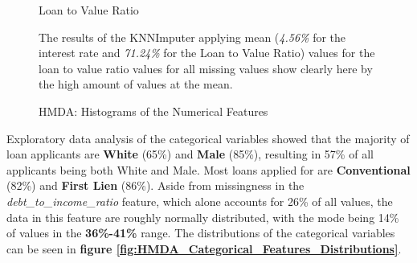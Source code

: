 \begin{figure}[h]
\begin{minipage}{0.5\textwidth}
        \small
        Loan to Value Ratio
    \end{minipage}    
    \caption{HMDA: Histograms of the Numerical Features}
    \medskip
    \small
    The results of the KNNImputer applying mean (\textit{4.56\%} for the interest rate and \textit{71.24\%} for the Loan to Value Ratio) values for the loan to value ratio values for all missing values show clearly here by the high amount of values at the mean.
    \label{fig:CHXX_Numerical_Distributions_2}
\end{figure}

Exploratory data analysis of the categorical variables showed that the majority of loan applicants are \textbf{White} (65\%) and \textbf{Male} (85\%), resulting in 57\% of all applicants being both White and Male.
Most loans applied for are \textbf{Conventional} (82\%) and \textbf{First Lien} (86\%).
Aside from missingness in the \textit{debt\_to\_income\_ratio} feature, which alone accounts for 26\% of all values, the data in this feature are roughly normally distributed, with the mode being 14\% of values in the \textbf{36\%-41\%} range. 
The distributions of the categorical variables can be seen in \textbf{figure \ref{fig:HMDA_Categorical_Features_Distributions}}.

